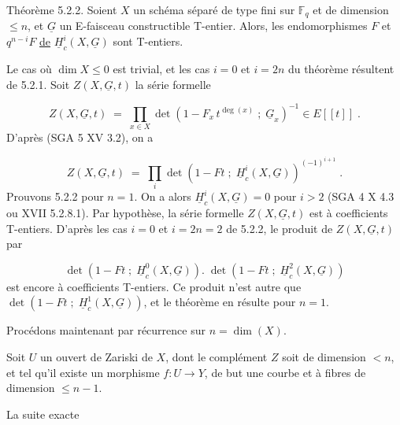 
Théorème 5.2.2. Soient $X$ un schéma séparé de type fini sur $\mathbb{F}_q$ et de dimension $\leq n$, et $\underline{G}$ un E-faisceau constructible T-entier. Alors, les endomorphismes $F$ et $q^{n-i} F$ \underline{de} $\underline{H}^i_c (X,\underline{G})$ sont T-entiers.

Le cas où $\dim X \leq 0$ est trivial, et les cas $i = 0$ et $i = 2n$ du théorème résultent de 5.2.1. Soit $Z(X,\underline{G},t)$ la série formelle

\begin{equation*}
Z(X,\underline{G},t) \;=\; \prod_{x \in X} \det (1-F_x \, t^{\deg(x)} \;;\; \underline{G}_x)^{-1} \in E[[t]] \;.
\end{equation*}
D'après (SGA 5 XV 3.2), on a

\begin{equation}\tag{5.2.3}
Z(X,\underline{G},t) \;=\; \prod_i \det (1-Ft \;;\; \underline{H}^i_c(X,\underline{G}))^{(-1)^{i+1}} \;.
\end{equation}
Prouvons 5.2.2 pour $n = 1$. On a alors $\underline{H}^i_c(X,\underline{G}) = 0$ pour $i > 2$ (SGA 4 X 4.3 ou XVII 5.2.8.1). Par hypothèse, la série formelle $Z(X,\underline{G},t)$ est à coefficients T-entiers. D'après les cas $i = 0$ et $i = 2n = 2$ de 5.2.2, le produit de $Z(X,\underline{G},t)$ par

\begin{equation*}
\det(1-Ft \;;\; \underline{H}^0_c(X,\underline{G})). \; \det(1-Ft \;;\; \underline{H}^2_c(X,\underline{G}))
\end{equation*}
est encore à coefficients T-entiers. Ce produit n'est autre que $\det(1-Ft \;;\; \underline{H}^1_c(X,\underline{G}))$, et le théorème en résulte pour $n = 1$.

Procédons maintenant par récurrence sur $n = \dim(X)$.

Soit $U$ un ouvert de Zariski de $X$, dont le complément $Z$ soit de dimension $< n$, et tel qu'il existe un morphisme $f : U \longrightarrow Y$, de but une courbe et à fibres de dimension $\leq n-1$.



\begin{center}
\end{center}
La suite exacte

